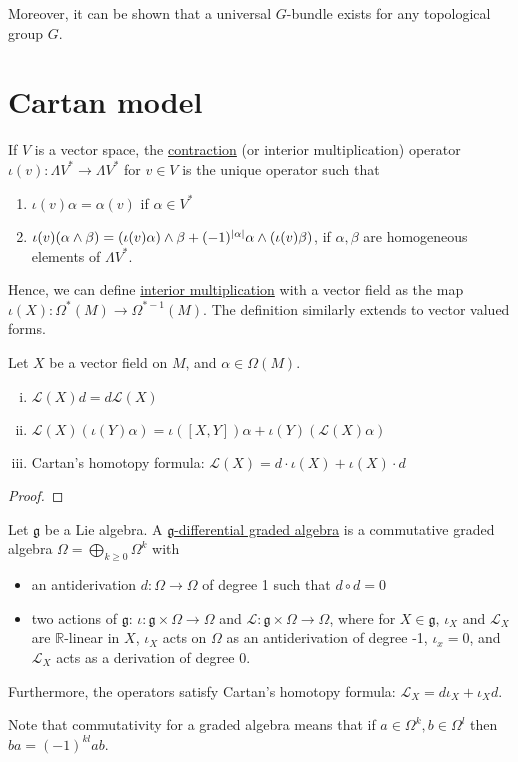 Moreover, it can be shown that a universal $G$-bundle exists for any topological
group  $G$. %


\section{Cartan model}
\begin{defn} \label{def:contraction} %
	If $V$ is a vector space, the \underline{contraction} (or interior
	multiplication) operator $\iota(v) :
	\Lambda V^* \to \Lambda V^*$ for $v\in V$ is the unique operator such that
	\begin{enumerate}[(1)]
	    \item $\iota(v)\alpha = \alpha(v)$ if  $\alpha\in V^*$
		\item $\iota(v)(\alpha\wedge\beta) = (\iota(v)\alpha)\wedge\beta + 
			(-1)^{\abs{\alpha}}\alpha\wedge(\iota(v)\beta)$, if  $\alpha,\beta$
			are homogeneous elements of  $\Lambda V^*$.
	\end{enumerate} %
\end{defn}
Hence, we can define \underline{interior multiplication} with a vector
field as the map $\iota(X) : \Omega^*(M) \to \Omega^{*-1}(M)$.
The definition similarly extends to vector valued forms.
\begin{thm} %
	Let $X$ be a vector field on  $M$, and $\alpha\in \Omega(M)$. 
	\begin{enumerate}[(i)]
	    \item $\mathcal{L}(X)d = d\mathcal{L}(X)$
		\item $\mathcal{L}(X)(\iota(Y)\alpha) = \iota([X,Y])\alpha +
			\iota(Y)(\mathcal{L}(X)\alpha)$ 
		\item Cartan's homotopy formula: $\mathcal{L}(X) = d
			\cdot\iota(X)+\iota(X)\cdot d$
	\end{enumerate}
\end{thm}
\begin{proof}
	
\end{proof}

\begin{defn}
	Let $\mathfrak{g}$ be a Lie algebra. A \underline{$\mathfrak{g}$-differential graded
	algebra} is a commutative graded algebra $\Omega= \bigoplus_{k\geq
	0}\Omega^k$ with 
	\begin{itemize}
		\item an antiderivation $d:\Omega\to\Omega$ of degree 1 such that
	$d\circ d = 0$
		\item two actions of $\mathfrak{g}$: $\iota:\mathfrak{g}\times\Omega\to\Omega$
			and  $\mathcal{L}:\mathfrak{g}\times\Omega\to\Omega$, where for
			$X\in\mathfrak{g}$,  $\iota_X$ and  $\mathcal{L}_X$ are
			$\mathbb{R}$-linear in $X$,  $\iota_X$ acts on  $\Omega$ as an
			antiderivation of degree -1,  $\iota_x = 0$, and  $\mathcal{L}_X$
			acts as a derivation of degree 0.
	\end{itemize}
	Furthermore, the operators satisfy Cartan's homotopy formula:
	$\mathcal{L}_X= d\iota_X+\iota_Xd$.
\end{defn}
Note that commutativity for a graded algebra means that if $a\in
\Omega^k,b\in\Omega^l$ then $ba = (-1)^{kl}ab$.  

